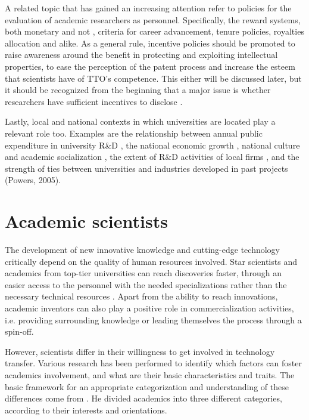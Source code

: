 A related topic that has gained an increasing attention refer to policies for the evaluation of academic researchers as personnel. Specifically, the reward systems, both monetary and not \citep{Guerrero2014}, criteria for career advancement, tenure policies, royalties allocation and alike. As a general rule, incentive policies should be promoted to raise awareness around the benefit in protecting and exploiting intellectual properties, to ease the perception of the patent process and increase the esteem that scientists have of TTO's competence. This either will be discussed later, but it should be recognized from the beginning that a major issue is whether researchers have sufficient incentives to disclose \citep{Debackere2005}.

Lastly, local and national contexts in which universities are located play a relevant role too. Examples are the relationship between annual public expenditure in university R\&D \citep{OShea2005}, the national economic growth \citep{Siegel2003a}, national culture and academic socialization \citep{Bercovitz2006}, the extent of R\&D activities of local firms \citep{Siegel2003a}, and the strength of ties between universities and industries developed in past projects (Powers, 2005). 

\section{Academic scientists}

The development of new innovative knowledge and cutting-edge technology critically depend on the quality of human resources involved. Star scientists and academics from top-tier universities can reach discoveries faster, through an easier access to the personnel with the needed specializations rather than the necessary technical resources \citep{OShea2005}. Apart from the ability to reach innovations, academic inventors can also play a positive role in commercialization activities, i.e. providing surrounding knowledge or leading themselves the process through a spin-off.

However, scientists differ in their willingness to get involved in technology transfer. Various research has been performed to identify which factors can foster academics involvement, and what are their basic characteristics and traits. The basic framework for an appropriate categorization and understanding of these differences come from \citet{Stokes1997}. He divided academics into three different categories, according to their interests and orientations. 

